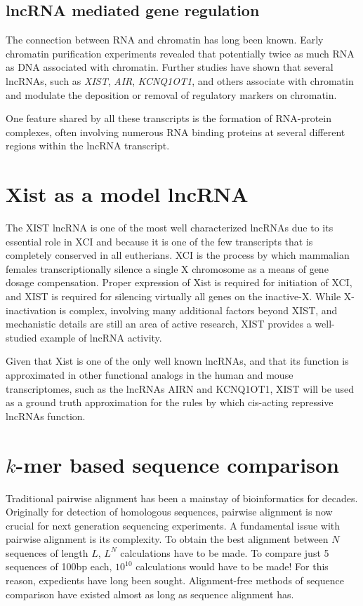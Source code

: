 \subsection{lncRNA mediated gene regulation}

The connection between RNA and chromatin has long been known. Early chromatin purification experiments revealed that potentially twice as much RNA as DNA associated with chromatin. Further studies have shown that several lncRNAs, such as \emph{XIST}, \emph{AIR}, \emph{KCNQ1OT1}, and others associate with chromatin and modulate the deposition or removal of regulatory markers on chromatin. 

One feature shared by all these transcripts is the formation of RNA-protein complexes, often involving numerous RNA binding proteins at several different regions within the lncRNA transcript. 

\section{Xist as a model lncRNA}
The XIST lncRNA is one of the most well characterized lncRNAs due to its essential role in XCI and because it is one of the few transcripts that is completely conserved in all eutherians. XCI is the process by which mammalian females transcriptionally silence a single X chromosome as a means of gene dosage compensation. Proper expression of Xist is required for initiation of XCI, and XIST is required for silencing virtually all genes on the inactive-X. While X-inactivation is complex, involving many additional factors beyond XIST, and mechanistic details are still an area of active research, XIST provides a well-studied example of lncRNA activity.

Given that Xist is one of the only well known lncRNAs, and that its function is approximated in other functional analogs in the human and mouse transcriptomes, such as the lncRNAs AIRN and KCNQ1OT1, XIST will be used as a ground truth approximation for the rules by which cis-acting repressive lncRNAs function.

\section{$k$-mer based sequence comparison}
Traditional pairwise alignment has been a mainstay of bioinformatics for decades. Originally for detection of homologous sequences, pairwise alignment is now crucial for next generation sequencing experiments. A fundamental issue with pairwise alignment is its complexity. To obtain the best alignment between $N$ sequences of length $L$, $L^N$ calculations have to be made. To compare just 5 sequences of 100bp each, $10^{10}$ calculations would have to be made! For this reason, expedients have long been sought. Alignment-free methods of sequence comparison have existed almost as long as sequence alignment has.

